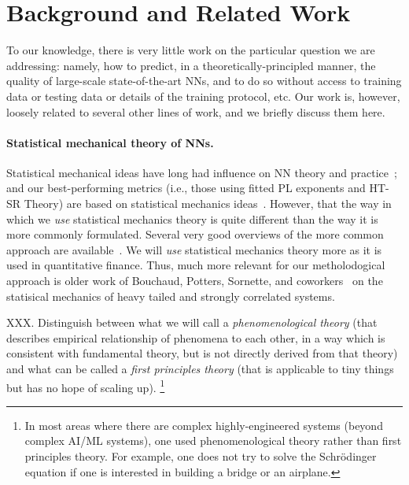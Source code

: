 \section{Background and Related Work}
\label{sxn:background}


To our knowledge, there is very little work on the particular question we are addressing: namely, how to predict, in a theoretically-principled manner, the quality of large-scale state-of-the-art NNs, and to do so without access to training data or testing data or details of the training protocol, etc.
Our work is, however, loosely related to several other lines of work, and we briefly discuss them here.

\paragraph{Statistical mechanical theory of NNs.}

Statistical mechanical ideas have long had influence on NN theory and practice~\cite{EB01_BOOK, MM17_TR, BKPx20}; and 
our best-performing metrics (i.e., those using fitted PL exponents and HT-SR Theory) are based on statistical mechanics ideas~\cite{MM17_TR, MM18_TR, MM19_HTSR_ICML, MM19_KDD, MM20_SDM}.
However, that the way in which we \emph{use} statistical mechanics theory is quite different than the way it is more commonly formulated.
Several very good overviews of the more common approach are available~\cite{EB01_BOOK, BKPx20}.
We will \emph{use} statistical mechanics theory more as it is used in quantitative finance.
Thus, much more relevant for our metholodogical approach is older work of Bouchaud, Potters, Sornette, and coworkers~\cite{BouchaudPotters03, SornetteBook, BP11, bun2017} on the statisical mechanics of heavy tailed and strongly correlated systems.


XXX.
Distinguish between what we will call a
\emph{phenomenological theory}
(that describes empirical relationship of phenomena to each other, in a way which is consistent with fundamental theory, but is not directly derived from that theory)
and what can be called a 
\emph{first principles theory} 
(that is applicable to tiny things but has no hope of scaling up).
\footnote{In most areas where there are complex highly-engineered systems (beyond complex AI/ML systems), one used phenomenological theory rather than first principles theory.  For example, one does not try to solve the Schr\"odinger equation if one is interested in building a bridge or an airplane.}


